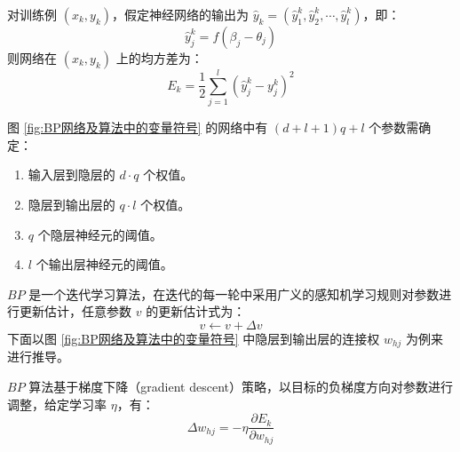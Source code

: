 \documentclass[12pt, a4paper]{article} %
\begin{document}
对训练例 $(x_k, y_k)$，假定神经网络的输出为 $\hat{y}_k = (\hat{y}_1^k, \hat{y}_2^k, \cdots, \hat{y}_l^k)$，即：
\begin{equation*}
    \hat{y}_j^k = f(\beta_j - \theta_j)
\end{equation*}
则网络在 $(x_k, y_k)$ 上的均方差为：
\begin{equation*}
    E_k = \frac{1}{2} \sum_{j = 1}^{l} (\hat{y}_j^k - y_j^k)^2
\end{equation*}

图 \ref{fig:BP网络及算法中的变量符号} 的网络中有 $(d + l + 1) q + l$ 个参数需确定：
\begin{enumerate}[\hspace*{2em} i.]
    \item 输入层到隐层的 $d \cdot q$ 个权值。
    \item 隐层到输出层的 $q \cdot l$ 个权值。
    \item $q$ 个隐层神经元的阈值。
    \item $l$ 个输出层神经元的阈值。
\end{enumerate}

$BP$ 是一个迭代学习算法，在迭代的每一轮中采用广义的感知机学习规则对参数进行更新估计，任意参数 $v$ 的更新估计式为：
\begin{equation*}
    v \leftarrow v + \Delta v
\end{equation*}
下面以图 \ref{fig:BP网络及算法中的变量符号} 中隐层到输出层的连接权 $w_{hj}$ 为例来进行推导。

$BP$ 算法基于梯度下降（gradient descent）策略，以目标的负梯度方向对参数进行调整，给定学习率 $\eta$，有：
\begin{equation*}
    \Delta w_{hj} = - \eta \frac{\partial E_k}{\partial w_{hj}}
\end{equation*}
\end{document}
